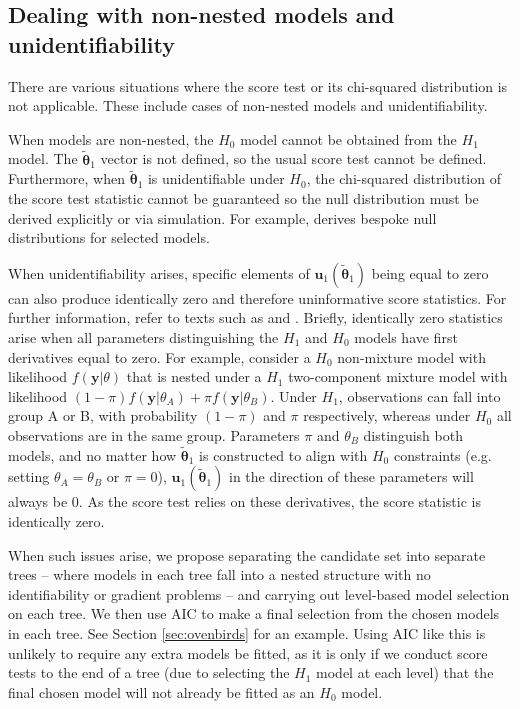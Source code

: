 \documentclass{article}
\newcommand{\thetaOneTilde}{\tilde{\boldsymbol{\theta}}_1}
\newcommand{\scoreU}{\boldsymbol{u}_1 (\thetaOneTilde)}
\begin{document}
\subsection{Dealing with non-nested models and unidentifiability}
\label{sec:non-nested-and-boundary-consid}

There are various situations where the score test or its chi-squared
distribution is not applicable. These include cases of non-nested
models and unidentifiability. 

When models are non-nested, the $H_0$ model cannot be obtained from
the $H_1$ model. The $\thetaOneTilde$ vector is not defined, so the
usual score test cannot be defined. Furthermore, when $\thetaOneTilde$ is
unidentifiable under $H_0$, the chi-squared distribution of the score test
statistic cannot be guaranteed so the null distribution must be
derived explicitly or via simulation. For example,
\textcite{andrews-2001} derives bespoke null distributions for
selected models.  

When unidentifiability arises, specific elements of $\scoreU$ being
equal to zero can also produce identically zero and therefore uninformative score
statistics. For further information, refer to texts such as
\textcite{cox-hinkley-1979} and \textcite{lee-chesher-1986}. Briefly,
identically zero statistics arise when all parameters distinguishing
the $H_1$ and $H_0$ models have first derivatives equal to zero. For
example, consider a $H_0$ non-mixture model with likelihood
$f(\boldsymbol{y}|\theta)$ that is nested under a $H_1$ two-component mixture model
with likelihood $(1-\pi)f(\boldsymbol{y}|\theta_A) + \pi
f(\boldsymbol{y}|\theta_B)$. Under $H_1$, observations can fall into
group A or B, with probability $(1-\pi)$ and $\pi$ respectively, whereas
under $H_0$ all observations are in the same group. Parameters $\pi$
and $\theta_B$ distinguish both models, and no matter how
$\thetaOneTilde$ is constructed to  align with $H_0$ constraints
(e.g. setting $\theta_A=\theta_B$ or $\pi=0$), $\scoreU$ in the
direction of these parameters will always be $0$. As the score test
relies on these derivatives, the score statistic is identically zero. 

When such issues arise, we propose separating the candidate set into
separate trees -- where models in each tree fall into a nested structure with
no identifiability or gradient problems -- and carrying out
level-based model selection on each tree. We then use AIC to make a
final selection from the chosen models in each tree. See Section
\ref{sec:ovenbirds} for an example. Using AIC like this is unlikely to
require any extra models be fitted, as it is only if we conduct score
tests to the end of a tree (due to selecting the $H_1$ model at each level) that
the final chosen model will not already be fitted as an $H_0$ model.
\end{document}
